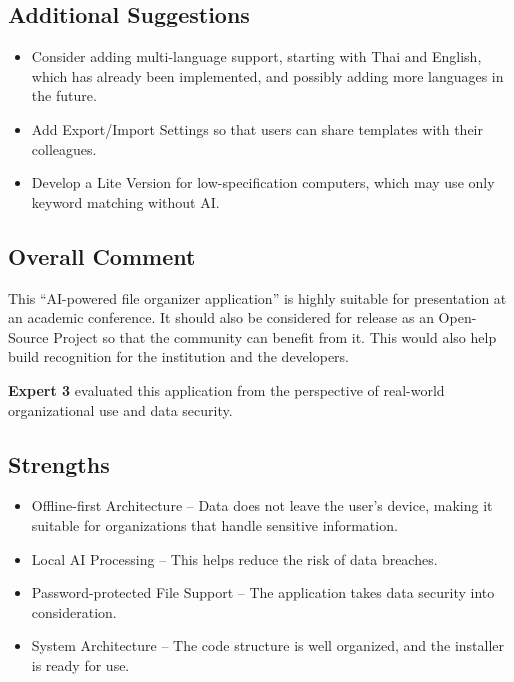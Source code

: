 \documentclass[12pt,oneside,openright,a4paper]{cpe-english-project}
\begin{document}
\subsection*{Additional Suggestions}
\begin{itemize}
\item Consider adding multi-language support, starting with Thai and English, which has already been implemented, and possibly adding more languages in the future.
\item Add Export/Import Settings so that users can share templates with their colleagues.
\item Develop a Lite Version for low-specification computers, which may use only keyword matching without AI.
\end{itemize}
\subsection*{Overall Comment}
This ``AI-powered file organizer application'' is highly suitable for presentation at an academic conference. It should also be considered for release as an Open-Source Project so that the community can benefit from it. This would also help build recognition for the institution and the developers.

\bigskip
\noindent\textbf{Expert 3} evaluated this application from the perspective of real-world organizational use and data security.

\subsection*{Strengths}
\begin{itemize}
\item Offline-first Architecture -- Data does not leave the user's device, making it suitable for organizations that handle sensitive information.
\item Local AI Processing -- This helps reduce the risk of data breaches.
\item Password-protected File Support -- The application takes data security into consideration.
\item System Architecture -- The code structure is well organized, and the installer is ready for use.
\end{itemize}
\end{document}
